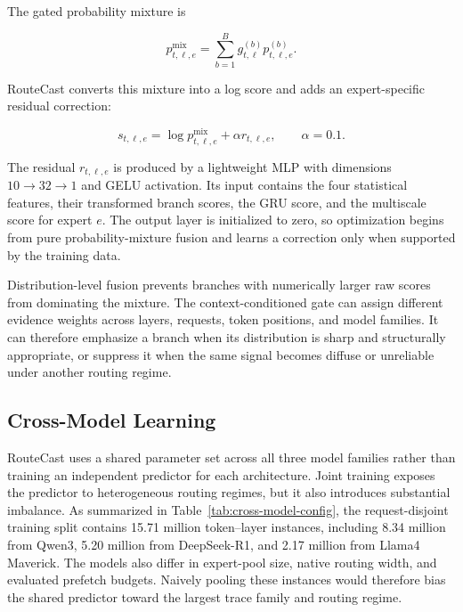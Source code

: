 \documentclass[conference]{IEEEtran}
\begin{document}
The gated probability mixture is

\begin{equation}
p_{t,\ell,e}^{\mathrm{mix}}
=
\sum_{b=1}^{B}
g_{t,\ell}^{(b)}
p_{t,\ell,e}^{(b)}.
\label{eq:probability-mixture}
\end{equation}

RouteCast converts this mixture into a log score and adds an expert-specific
residual correction:

\begin{equation}
s_{t,\ell,e}
=
\log
p_{t,\ell,e}^{\mathrm{mix}}
+
\alpha r_{t,\ell,e},
\qquad
\alpha=0.1.
\label{eq:fusion}
\end{equation}

The residual \(r_{t,\ell,e}\) is produced by a lightweight MLP with dimensions
\(10\rightarrow32\rightarrow1\) and GELU activation. Its input contains the
four statistical features, their transformed branch scores, the GRU score,
and the multiscale score for expert \(e\). The output layer is initialized to
zero, so optimization begins from pure probability-mixture fusion and learns
a correction only when supported by the training data.

Distribution-level fusion prevents branches with numerically larger raw
scores from dominating the mixture. The context-conditioned gate can assign
different evidence weights across layers, requests, token positions, and model
families. It can therefore emphasize a branch when its distribution is sharp
and structurally appropriate, or suppress it when the same signal becomes
diffuse or unreliable under another routing regime.
\subsection{Cross-Model Learning}

RouteCast uses a shared parameter set across all three model families rather
than training an independent predictor for each architecture. Joint training
exposes the predictor to heterogeneous routing regimes, but it also introduces
substantial imbalance. As summarized in
Table~\ref{tab:cross-model-config}, the request-disjoint training split contains
15.71 million token--layer instances, including 8.34 million from Qwen3,
5.20 million from DeepSeek-R1, and 2.17 million from Llama4 Maverick.
The models also differ in expert-pool size, native routing width, and evaluated
prefetch budgets. Naively pooling these instances would therefore bias the
shared predictor toward the largest trace family and routing regime.
\end{document}

